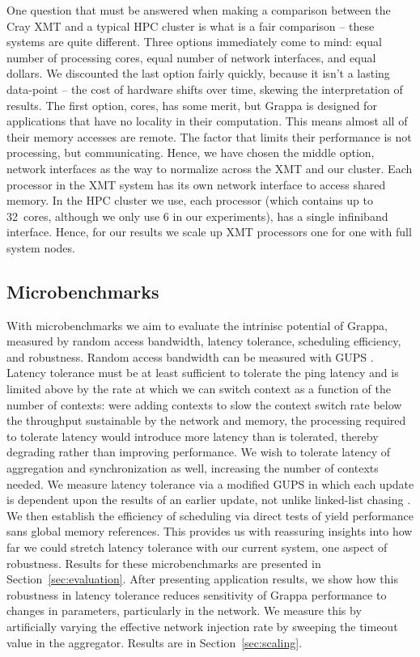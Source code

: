 One question that must be answered when making a comparison between the
Cray XMT and a typical HPC cluster is what is a fair comparison -- these
systems are quite different.  Three options immediately come to mind:
equal number of processing cores, equal number of network interfaces,
and equal dollars.  We discounted the last option fairly quickly,
because it isn't a lasting data-point -- the cost of hardware shifts
over time, skewing the interpretation of results.  The first option,
cores, has some merit, but Grappa is designed for applications that have
no locality in their computation.  This means almost all of their memory
accesses are remote.  The factor that limits their performance is not
processing, but communicating.  Hence, we have chosen the middle option,
network interfaces as the way to normalize across the XMT and our
cluster.  Each processor in the XMT system has its own network interface
to access shared memory.  In the HPC cluster we use, each processor
(which contains up to 32~cores, although we only use 6 in our
experiments), has a single infiniband interface.
Hence, for our results
we scale up XMT processors one for one with full system nodes.

\subsection{Microbenchmarks}
With microbenchmarks we aim to evaluate the intrinisc potential of
Grappa, measured by random access bandwidth, latency tolerance,
scheduling efficiency, and robustness.   Random access
bandwidth can be measured with GUPS .
Latency tolerance must be at least sufficient to tolerate the ping
latency and is limited above by the rate at which we can switch
context as a function of the number of contexts: were adding contexts
to slow the context switch rate below the throughput sustainable by
the network and memory, the processing required to tolerate latency
would introduce more latency than is tolerated, thereby degrading
rather than improving performance.  We wish to tolerate latency of
aggregation and synchronization as well, increasing the number of
contexts needed.  We measure latency tolerance via a modified GUPS in
which each update is dependent upon the results of an earlier update,
not unlike linked-list chasing .  We then
establish the efficiency of scheduling via direct tests of yield
performance sans global memory references.  This provides us with
reassuring insights into how far we could stretch latency tolerance
with our current system, one aspect of robustness.  Results for these
microbenchmarks are presented in Section~\ref{sec:evaluation}.
After presenting application results, we show how this robustness
in latency tolerance reduces sensitivity of Grappa performance to changes
in parameters, particularly in the network.  We measure
this by artificially varying the effective network injection rate by
sweeping the timeout value in the aggregator.  Results are in Section~\ref{sec:scaling}.

